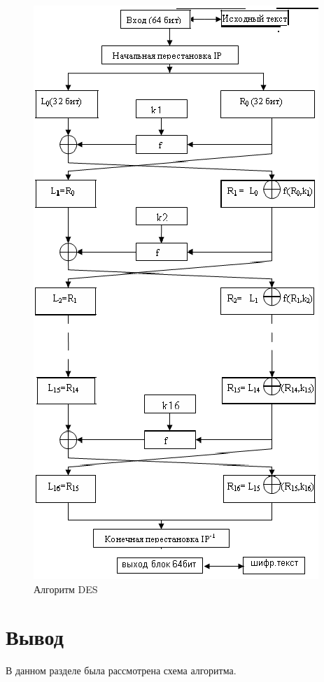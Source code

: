 \begin{figure}[H]
\centering
\includegraphics[scale=1.2]{./pict/Code.png}
\caption{Алгоритм DES}
\end{figure}

\section{Вывод}
В данном разделе была рассмотрена схема алгоритма.
